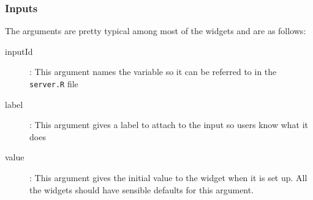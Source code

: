 \documentclass{beamer}
\begin{document}
\begin{frame}
	\Large
	\frametitle{Inputs}
	The arguments are pretty typical among most of the widgets and are
	as follows:
	\begin{description}
		\item[ inputId]: This argument names the variable so it can be referred to in the
		\texttt{server.R} file
		\item[ label]: This argument gives a label to attach to the input so users know
		what it does
		\item[value]: This argument gives the initial value to the widget when it is
		set up. All the widgets should have sensible defaults for this argument.
	\end{description}
\end{frame}
\end{document}
